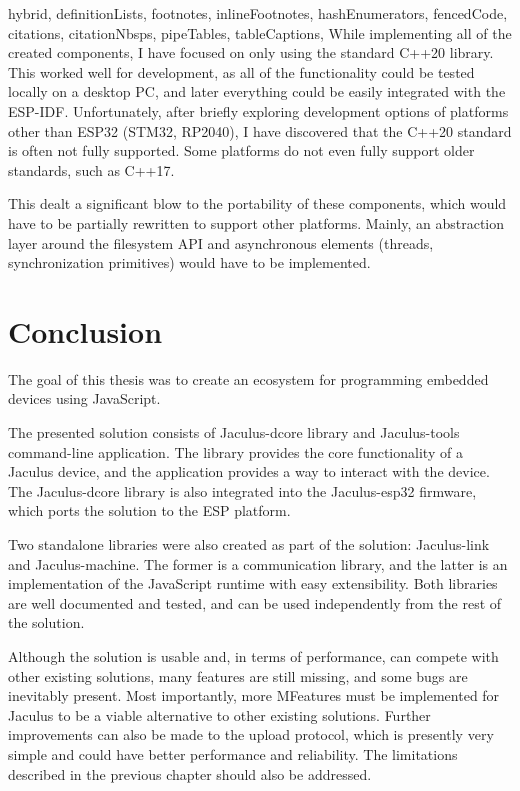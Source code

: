 \begin{markdown*}{%
  hybrid,
  definitionLists,
  footnotes,
  inlineFootnotes,
  hashEnumerators,
  fencedCode,
  citations,
  citationNbsps,
  pipeTables,
  tableCaptions,
}
While implementing all of the created components, I have focused on only using the standard C++20 library. This worked well for development, as all of the functionality could be tested locally on a desktop PC, and later everything could be easily integrated with the ESP-IDF. Unfortunately, after briefly exploring development options of platforms other than ESP32 (STM32, RP2040), I have discovered that the C++20 standard is often not fully supported. Some platforms do not even fully support older standards, such as C++17.

This dealt a significant blow to the portability of these components, which would have to be partially rewritten to support other platforms. Mainly, an abstraction layer around the filesystem API and asynchronous elements (threads, synchronization primitives) would have to be implemented.


\chapter{Conclusion}

The goal of this thesis was to create an ecosystem for programming embedded devices using JavaScript.

The presented solution consists of Jaculus-dcore library and Jaculus-tools command-line application. The library provides the core functionality of a Jaculus device, and the application provides a way to interact with the device. The Jaculus-dcore library is also integrated into the Jaculus-esp32 firmware, which ports the solution to the ESP platform.

Two standalone libraries were also created as part of the solution: Jaculus-link and Jaculus-machine. The former is a communication library, and the latter is an implementation of the JavaScript runtime with easy extensibility. Both libraries are well documented and tested, and can be used independently from the rest of the solution.

Although the solution is usable and, in terms of performance, can compete with other existing solutions, many features are still missing, and some bugs are inevitably present. Most importantly, more MFeatures must be implemented for Jaculus to be a viable alternative to other existing solutions. Further improvements can also be made to the upload protocol, which is presently very simple and could have better performance and reliability. The limitations described in the previous chapter should also be addressed.

\end{markdown*}

